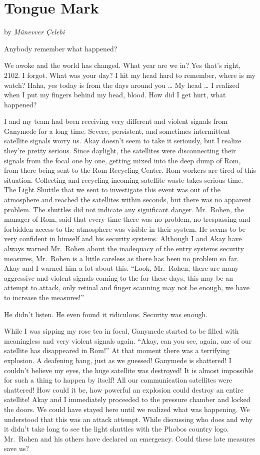 \documentclass[]{book}
\begin{document}
\hypertarget{tongue-mark}{%
\chapter{Tongue Mark}\label{tongue-mark}}

by \emph{Münevver Çelebi}

Anybody remember what happened?

We awoke and the world has changed. What year are we in? Yes that's right, 2102. I forgot. What was your day? I hit my head hard to remember, where is my watch? Haha, yes today is from the days around you \ldots{} My head \ldots{} I realized when I put my fingers behind my head, blood. How did I get hurt, what happened?

I and my team had been receiving very different and violent signals from Ganymede for a long time. Severe, persistent, and sometimes intermittent satellite signals worry us. Akay doesn't seem to take it seriously, but I realize they're pretty serious. Since daylight, the satellites were disconnecting their signals from the focal one by one, getting mixed into the deep dump of Rom, from there being sent to the Rom Recycling Center. Rom workers are tired of this situation. Collecting and recycling incoming satellite waste takes serious time. The Light Shuttle that we sent to investigate this event was out of the atmosphere and reached the satellites within seconds, but there was no apparent problem. The shuttles did not indicate any significant danger. Mr.~Rohen, the manager of Rom, said that every time there was no problem, no trespassing and forbidden access to the atmosphere was visible in their system. He seems to be very confident in himself and his security systems. Although I and Akay have always warned Mr.~Rohen about the inadequacy of the entry systems security measures, Mr.~Rohen is a little careless as there has been no problem so far. Akay and I warned him a lot about this. ``Look, Mr.~Rohen, there are many aggressive and violent signals coming to the for these days, this may be an attempt to attack, only retinal and finger scanning may not be enough, we have to increase the measures!''

He didn't listen. He even found it ridiculous. Security was enough.

While I was sipping my rose tea in focal, Ganymede started to be filled with meaningless and very violent signals again. ``Akay, can you see, again, one of our satellite has disappeared in Rom!'' At that moment there was a terrifying explosion. A deafening bang, just as we guessed! Ganymede is shattered!
I couldn't believe my eyes, the huge satellite was destroyed! It is almost impossible for such a thing to happen by itself! All our communication satellites were shattered! How could it be, how powerful an explosion could destroy an entire satellite! Akay and I immediately proceeded to the pressure chamber and locked the doors. We could have stayed here until we realized what was happening. We understood that this was an attack attempt. While discussing who does and why it didn't take long to see the light shuttles with the Phobos country logo. Mr.~Rohen and his others have declared an emergency. Could these late measures save us?
\end{document}
